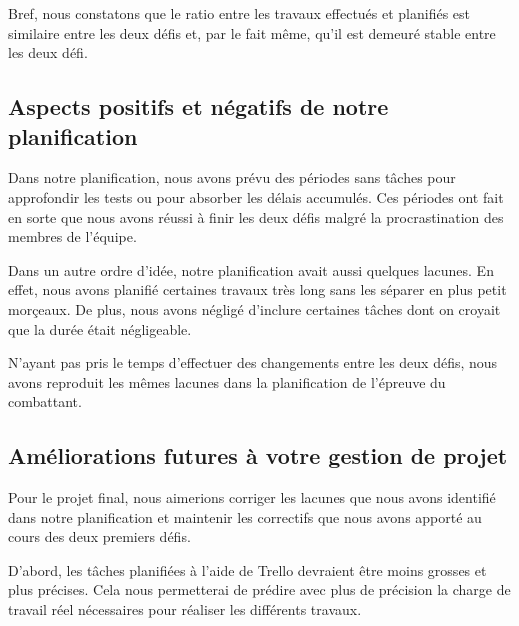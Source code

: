 \begin{spacing}{1.5}
    Bref, nous constatons que le ratio entre les travaux effectués et planifiés est similaire entre les deux défis et, par le fait même, qu'il est demeuré stable entre les deux défi.
\end{spacing}

\subsection{Aspects positifs et négatifs de notre planification}

\begin{spacing}{1.5}
    Dans notre planification, nous avons prévu des périodes sans tâches pour approfondir les tests ou pour absorber les délais accumulés.
    Ces périodes ont fait en sorte que nous avons réussi à finir les deux défis malgré la procrastination des membres de l'équipe.
\end{spacing}

\begin{spacing}{1.5}
    Dans un autre ordre d'idée, notre planification avait aussi quelques lacunes.
    En effet, nous avons planifié certaines travaux très long sans les séparer en plus petit morçeaux.
    De plus, nous avons négligé d'inclure certaines tâches dont on croyait que la durée était négligeable.
\end{spacing}

\begin{spacing}{1.5}
    N'ayant pas pris le temps d'effectuer des changements entre les deux défis, nous avons reproduit les mêmes lacunes dans la planification de l'épreuve du combattant.
\end{spacing}

\subsection{Améliorations futures à votre gestion de projet}

\begin{spacing}{1.5}
    Pour le projet final, nous aimerions corriger les lacunes que nous avons identifié dans notre planification et maintenir les correctifs que nous avons apporté au cours des deux premiers défis.
\end{spacing}

\begin{spacing}{1.5}
    D'abord, les tâches planifiées à l'aide de Trello devraient être moins grosses et plus précises. Cela nous permetterai de prédire avec plus de précision la charge de travail réel nécessaires pour réaliser les différents travaux.
\end{spacing}


